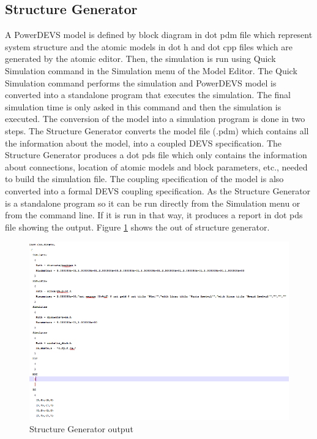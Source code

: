 \documentclass[titlepage]{report}%
\begin{document}
\subsection{Structure Generator}
A PowerDEVS model is defined by block diagram in dot pdm file which represent system structure and the atomic models in dot h and dot cpp files which are generated by the atomic editor. Then, the simulation is run using Quick Simulation command in the Simulation menu of the Model Editor. The Quick Simulation command performs the simulation and PowerDEVS model is converted into a standalone program that executes the simulation. The final simulation time is only asked in this command and then the simulation is executed.
The conversion of the model into a simulation program is done in two steps. The Structure Generator converts the model file (.pdm) which contains all the information about the model, into a coupled DEVS specification. The Structure Generator produces a dot pds file which only contains the information about connections, location of atomic models and block parameters, etc., needed to build the simulation file. The coupling specification of the model is also converted into a formal DEVS coupling specification. As the Structure Generator is a standalone program so it can be run directly from the Simulation menu or from the command line. If it is run in that way, it produces a report in dot pds file showing the output. Figure \ref{Struc_gen} shows the out of structure generator.

\begin{figure}[ht!]
  \centering
    \includegraphics[width=1\textwidth]{Fig7.png}
    \caption{Structure Generator output}
    \label{Struc_gen}
\end{figure}
\end{document}
